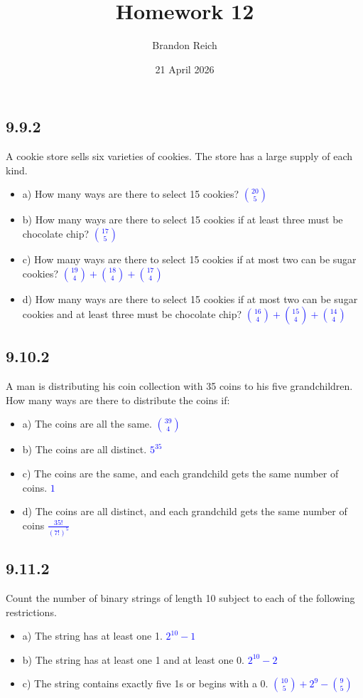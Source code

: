 \documentclass{article}
\title{Homework 12}
\author{Brandon Reich}
\date{21 April 2026}
\begin{document}
\maketitle

\subsection*{9.9.2} A cookie store sells six varieties of cookies. The store has a large supply of each kind.
\begin{itemize}
    \item a) How many ways are there to select 15 cookies? 
    \textcolor{blue}{$\binom{20}{5}$}
    \item b) How many ways are there to select 15 cookies if at least three must be chocolate chip? 
    \textcolor{blue}{$\binom{17}{5}$}
    \item c) How many ways are there to select 15 cookies if at most two can be sugar cookies? 
    \textcolor{blue}{$\binom{19}{4} + \binom{18}{4} + \binom{17}{4}$}
    \item d) How many ways are there to select 15 cookies if at most two can be sugar cookies and at least three must be chocolate chip? 
    \textcolor{blue}{$\binom{16}{4} + \binom{15}{4} + \binom{14}{4}$}
\end{itemize}

\subsection*{9.10.2} A man is distributing his coin collection with 35 coins to his five grandchildren. How many ways are there to distribute the coins if:
\begin{itemize}
    \item a) The coins are all the same.
    \textcolor{blue}{$\binom{39}{4}$}
    \item b) The coins are all distinct.
    \textcolor{blue}{$5^{35}$}
    \item c) The coins are the same, and each grandchild gets the same number of coins.
    \textcolor{blue}{$1$}
    \item d) The coins are all distinct, and each grandchild gets the same number of coins
    \textcolor{blue}{$\frac{35!}{(7!)^5}$}
\end{itemize}

\subsection*{9.11.2} Count the number of binary strings of length 10 subject to each of the following restrictions.
\begin{itemize}
    \item a) The string has at least one 1.
    \textcolor{blue}{$2^{10} - 1$}
    \item b) The string has at least one 1 and at least one 0.
    \textcolor{blue}{$2^{10} - 2$}
    \item c) The string contains exactly five 1s or begins with a 0.
    \textcolor{blue}{$\binom{10}{5} + 2^9 - \binom{9}{5}$}
\end{itemize}
\end{document}
